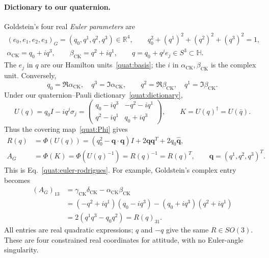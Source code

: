 \paragraph{Dictionary to our quaternion.}
Goldstein's four real \emph{Euler parameters} are
\begin{equation}\label{gnc:euler-parameters}
 \begin{gathered}
 (e_0,e_1,e_2,e_3)_G=(q_0,q^1,q^2,q^3)\in\mathbb R^4,\qquad
 q_0^2+(q^1)^2+(q^2)^2+(q^3)^2=1,\\
 \alpha_{\mathrm{CK}}=q_0+iq^3,\qquad
 \beta_{\mathrm{CK}}=q^2+iq^1,\qquad
 q=q_0+q^je_j\in S^3\subset\mathbb H.
 \end{gathered}
\end{equation}
The $e_j$ in $q$ are our Hamilton units~\eqref{quat:basis}; the $i$ in
$\alpha_{\mathrm{CK}},\beta_{\mathrm{CK}}$ is the complex unit.
Conversely,
\[
 q_0=\Re\alpha_{\mathrm{CK}},\quad q^3=\Im\alpha_{\mathrm{CK}},\qquad
 q^2=\Re\beta_{\mathrm{CK}},\quad q^1=\Im\beta_{\mathrm{CK}}.
\]
Under our quaternion--Pauli dictionary~\eqref{quat:dictionary},
\begin{equation}\label{gnc:ck-su2-dictionary}
 U(q)=q_0I-iq^j\sigma_j
 =\begin{pmatrix}q_0-iq^3&-q^2-iq^1\\q^2-iq^1&q_0+iq^3\end{pmatrix},
 \qquad K=U(q)^\dagger=U(\bar q).
\end{equation}
Thus the covering map~\eqref{quat:Phi} gives
\begin{equation}\label{gnc:ck-rotation}
 \begin{aligned}
 R(q)&=\Phi(U(q))
 =(q_0^2-\mathbf q\cdot\mathbf q)I
   +2\mathbf q\mathbf q^T+2q_0\widehat{\mathbf q},\\
 A_G&=\Phi(K)=\Phi(U(q)^{-1})=R(q)^{-1}=R(q)^T,
 \qquad\mathbf q=(q^1,q^2,q^3)^T.
 \end{aligned}
\end{equation}
This is Eq.~\eqref{quat:euler-rodrigues}. For example, Goldstein's complex
entry becomes
\begin{align*}
 (A_G)_{13}
 &=\gamma_{\mathrm{CK}}\delta_{\mathrm{CK}}
   -\alpha_{\mathrm{CK}}\beta_{\mathrm{CK}}\\
 &=(-q^2+iq^1)(q_0-iq^3)-(q_0+iq^3)(q^2+iq^1)\\
 &=2(q^1q^3-q_0q^2)=R(q)_{31}.
\end{align*}
All entries are real quadratic expressions; $q$ and $-q$ give the same
$R\in SO(3)$. These are four constrained real coordinates for attitude,
with no Euler-angle singularity.

